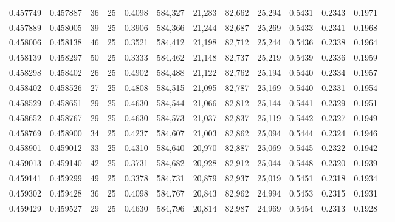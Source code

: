 \begin{tabular}{rrrrrrrrrrrrr}
0.457749 & 0.457887 &    36 &  25 &                                     0.4098 & 584,327 &  21,283 &  82,662 &  25,294 & 0.5431 & 0.2343 & 0.1971 \\
0.457889 & 0.458005 &    39 &  25 &                                     0.3906 & 584,366 &  21,244 &  82,687 &  25,269 & 0.5433 & 0.2341 & 0.1968 \\
0.458006 & 0.458138 &    46 &  25 &                                     0.3521 & 584,412 &  21,198 &  82,712 &  25,244 & 0.5436 & 0.2338 & 0.1964 \\
0.458139 & 0.458297 &    50 &  25 &                                     0.3333 & 584,462 &  21,148 &  82,737 &  25,219 & 0.5439 & 0.2336 & 0.1959 \\
0.458298 & 0.458402 &    26 &  25 &                                     0.4902 & 584,488 &  21,122 &  82,762 &  25,194 & 0.5440 & 0.2334 & 0.1957 \\
0.458402 & 0.458526 &    27 &  25 &                                     0.4808 & 584,515 &  21,095 &  82,787 &  25,169 & 0.5440 & 0.2331 & 0.1954 \\
0.458529 & 0.458651 &    29 &  25 &                                     0.4630 & 584,544 &  21,066 &  82,812 &  25,144 & 0.5441 & 0.2329 & 0.1951 \\
0.458652 & 0.458767 &    29 &  25 &                                     0.4630 & 584,573 &  21,037 &  82,837 &  25,119 & 0.5442 & 0.2327 & 0.1949 \\
0.458769 & 0.458900 &    34 &  25 &                                     0.4237 & 584,607 &  21,003 &  82,862 &  25,094 & 0.5444 & 0.2324 & 0.1946 \\
0.458901 & 0.459012 &    33 &  25 &                                     0.4310 & 584,640 &  20,970 &  82,887 &  25,069 & 0.5445 & 0.2322 & 0.1942 \\
0.459013 & 0.459140 &    42 &  25 &                                     0.3731 & 584,682 &  20,928 &  82,912 &  25,044 & 0.5448 & 0.2320 & 0.1939 \\
0.459141 & 0.459299 &    49 &  25 &                                     0.3378 & 584,731 &  20,879 &  82,937 &  25,019 & 0.5451 & 0.2318 & 0.1934 \\
0.459302 & 0.459428 &    36 &  25 &                                     0.4098 & 584,767 &  20,843 &  82,962 &  24,994 & 0.5453 & 0.2315 & 0.1931 \\
0.459429 & 0.459527 &    29 &  25 &                                     0.4630 & 584,796 &  20,814 &  82,987 &  24,969 & 0.5454 & 0.2313 & 0.1928 \\

\end{tabular}
